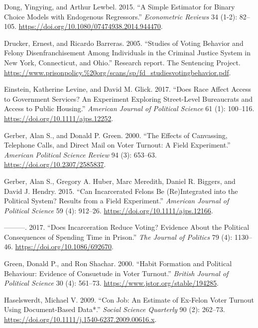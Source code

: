 \documentclass[
  12pt,
]{article}
\newlength{\cslhangindent}
\newenvironment{cslreferences}%
  {\setlength{\parindent}{0pt}%
  \everypar{\setlength{\hangindent}{\cslhangindent}}\ignorespaces}%
  {\par}
\begin{document}
\begin{cslreferences}
\leavevmode\hypertarget{ref-Dong2015}{}%
Dong, Yingying, and Arthur Lewbel. 2015. ``A Simple Estimator for Binary Choice Models with Endogenous Regressors.'' \emph{Econometric Reviews} 34 (1-2): 82--105. \url{https://doi.org/10.1080/07474938.2014.944470}.

\leavevmode\hypertarget{ref-Drucker2005}{}%
Drucker, Ernest, and Ricardo Barreras. 2005. ``Studies of Voting Behavior and Felony Disenfranchisement Among Individuals in the Criminal Justice System in New York, Connecticut, and Ohio.'' Research report. The Sentencing Project. \url{https://www.prisonpolicy.\%20org/scans/sp/fd_studiesvotingbehavior.pdf}.

\leavevmode\hypertarget{ref-Einstein2017}{}%
Einstein, Katherine Levine, and David M. Glick. 2017. ``Does Race Affect Access to Government Services? An Experiment Exploring Street-Level Bureaucrats and Access to Public Housing.'' \emph{American Journal of Political Science} 61 (1): 100--116. \url{https://doi.org/10.1111/ajps.12252}.

\leavevmode\hypertarget{ref-Gerber2000}{}%
Gerber, Alan S., and Donald P. Green. 2000. ``The Effects of Canvassing, Telephone Calls, and Direct Mail on Voter Turnout: A Field Experiment.'' \emph{American Political Science Review} 94 (3): 653--63. \url{https://doi.org/10.2307/2585837}.

\leavevmode\hypertarget{ref-Gerber2015}{}%
Gerber, Alan S., Gregory A. Huber, Marc Meredith, Daniel R. Biggers, and David J. Hendry. 2015. ``Can Incarcerated Felons Be (Re)Integrated into the Political System? Results from a Field Experiment.'' \emph{American Journal of Political Science} 59 (4): 912--26. \url{https://doi.org/10.1111/ajps.12166}.

\leavevmode\hypertarget{ref-Gerber2017}{}%
---------. 2017. ``Does Incarceration Reduce Voting? Evidence About the Political Consequences of Spending Time in Prison.'' \emph{The Journal of Politics} 79 (4): 1130--46. \url{https://doi.org/10.1086/692670}.

\leavevmode\hypertarget{ref-Green2000}{}%
Green, Donald P., and Ron Shachar. 2000. ``Habit Formation and Political Behaviour: Evidence of Consuetude in Voter Turnout.'' \emph{British Journal of Political Science} 30 (4): 561--73. \url{https://www.jstor.org/stable/194285}.

\leavevmode\hypertarget{ref-Haselswerdt2009}{}%
Haselswerdt, Michael V. 2009. ``Con Job: An Estimate of Ex-Felon Voter Turnout Using Document-Based Data*.'' \emph{Social Science Quarterly} 90 (2): 262--73. \url{https://doi.org/10.1111/j.1540-6237.2009.00616.x}.


\end{cslreferences}
\end{document}
